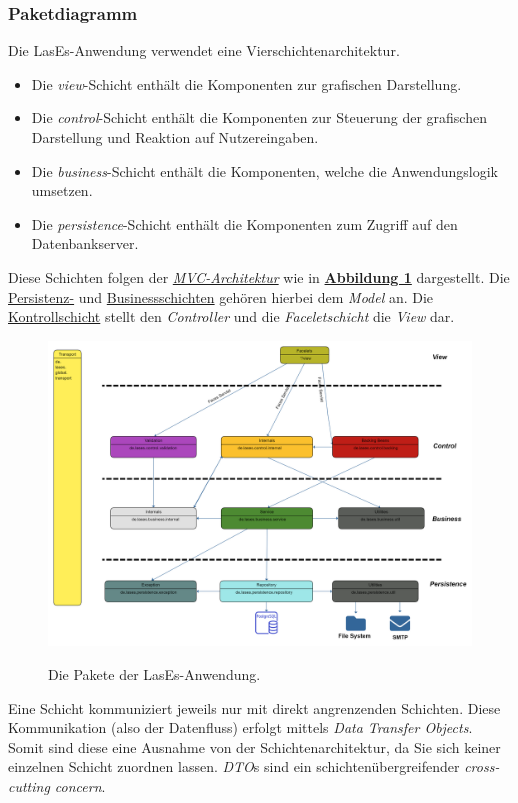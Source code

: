 \subsubsection{Paketdiagramm}

Die LasEs-Anwendung verwendet eine Vierschichtenarchitektur.
\begin{itemize}
    \item Die \emph{view}-Schicht enthält die Komponenten zur grafischen Darstellung.
    \item Die \emph{control}-Schicht enthält die Komponenten zur Steuerung der grafischen Darstellung und Reaktion auf
    Nutzereingaben.
    \item Die \emph{business}-Schicht enthält die Komponenten, welche die Anwendungslogik umsetzen.
    \item Die \emph{persistence}-Schicht enthält die Komponenten zum Zugriff auf den Datenbankserver.
\end{itemize}
Diese Schichten folgen der \emph{\hyperref[arch:mvc]{MVC-Architektur}} wie in
\textbf{\hyperref[feinarch:pakdia]{Abbildung 1}} dargestellt.
Die \hyperref[arch:persistence]{Persistenz-} und
\hyperref[arch:business]{Businessschichten} gehören hierbei
dem \emph{Model} an. Die \hyperref[arch:control]{Kontrollschicht} stellt den \emph{Controller} und die
\emph{Faceletschicht} die \emph{View} dar.
\begin{figure}[H]
    \centering
    \includegraphics[width=0.8\linewidth]{graphics/Paketdiagramm10.0}\label{feinarch:pakdia}
    \caption{Die Pakete der LasEs-Anwendung.}
\end{figure}

Eine Schicht kommuniziert jeweils nur mit direkt angrenzenden Schichten.
Diese Kommunikation (also der Datenfluss) erfolgt mittels \emph{Data Transfer Objects}.
Somit sind diese eine Ausnahme von der Schichtenarchitektur, da Sie sich keiner
einzelnen Schicht zuordnen lassen.
\emph{DTO}s sind ein schichtenübergreifender \emph{cross-cutting concern}.